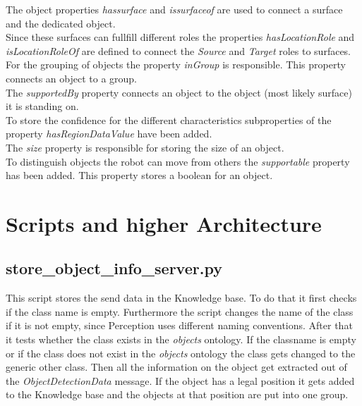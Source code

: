\documentclass[main.tex]{subfiles}
\begin{document}
The object properties \textit{hassurface} and \textit{issurfaceof} are used to connect a surface and the dedicated object.\\
Since these surfaces can fullfill different roles the properties \textit{hasLocationRole} and \textit{isLocationRoleOf} are defined to connect the \textit{Source} and \textit{Target} roles to surfaces.\\
For the grouping of objects the property \textit{inGroup} is responsible. This property connects an object to a group.\\
The \textit{supportedBy} property connects an object to the object (most likely surface) it is standing on.\\
To store the confidence for the different characteristics subproperties of the property \textit{hasRegionDataValue} have been added.\\
The \textit{size} property is responsible for storing the size of an object.\\
To distinguish objects the robot can move from others the \textit{supportable} property has been added. This property stores a boolean for an object.



\section{Scripts and higher Architecture}
\subsection{store\_object\_info\_server.py}
This script stores the send data in the Knowledge base.
To do that it first checks if the class name is empty. Furthermore the script changes the name of the class if it is not empty, since Perception uses different naming conventions. After that it tests whether the class exists in the \textit{objects} ontology. If the classname is empty or if the class does not exist in the \textit{objects} ontology the class gets changed to the generic other class. Then all the information on the object get extracted out of the \textit{ObjectDetectionData} message. If the object has a legal position it gets added to the Knowledge base and the objects at that position are put into one group.

	\endgroup
\end{document}
